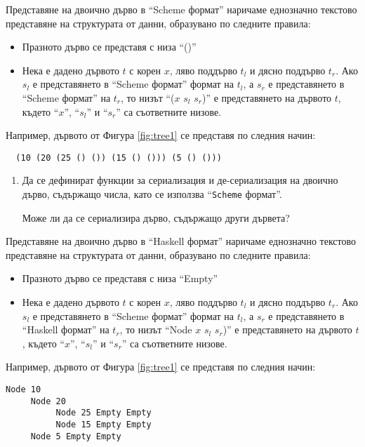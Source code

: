 \begin{mdframed}[hidealllines=true,backgroundcolor=gray!20]
  Представяне на двоично дърво в ``Scheme формат'' наричаме еднозначно текстово представяне на структурата от данни, образувано по следните правила:
  \begin{itemize}
    \item Празното дърво се представя с низа ``()''
    \item Нека е дадено дървото $t$ с корен $x$, ляво поддърво $t_l$ и дясно поддърво $t_r$. Ако $s_l$ е представянето в ``Scheme формат'' формат на $t_l$, а $s_r$ е представянето в ``Scheme формат'' на $t_r$, то низът ``($x$ $s_l$ $s_r$)'' е представянето на дървото $t$, където ``$x$'', ``$s_l$'' и ``$s_r$'' са съответните низове.
  
  \end{itemize}
  Например, дървото от Фигура \ref{fig:tree1} се представя по следния начин:
  
  \begin{verbatim}
  (10 (20 (25 () ()) (15 () ())) (5 () ()))
  \end{verbatim}
  
  \end{mdframed}

\begin{enumerate}[resume]

  \item Да се дефинират функции за сериализация и де-сериализация на двоично дърво, съдържащо числа, като се използва ``\texttt{Scheme} формат''.
  
   Може ли да се сериализира дърво, съдържащо други дървета?
\end{enumerate}


\begin{mdframed}[hidealllines=true,backgroundcolor=gray!20]
Представяне на двоично дърво в ``Haskell формат'' наричаме еднозначно текстово представяне на структурата от данни, образувано по следните правила:
\begin{itemize}
\item Празното дърво се представя с низа ``Empty''
\item Нека е дадено дървото $t$ с корен $x$, ляво поддърво $t_l$ и дясно поддърво $t_r$. Ако $s_l$ е представянето в ``Scheme формат'' формат на $t_l$, а $s_r$ е представянето в ``Haskell формат'' на $t_r$, то низът ``Node $x$ $s_l$ $s_r$)'' е представянето на дървото $t$, където ``$x$'', ``$s_l$'' и ``$s_r$'' са съответните низове.

\end{itemize}
Например, дървото от Фигура \ref{fig:tree1} се представя по следния начин:

\begin{verbatim}
Node 10 
     Node 20
          Node 25 Empty Empty
          Node 15 Empty Empty
     Node 5 Empty Empty
\end{verbatim}

\end{mdframed}

